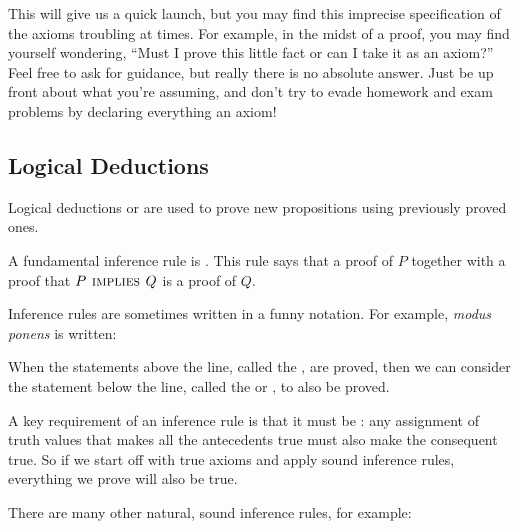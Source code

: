 This will give us a quick launch, but you may find this imprecise
specification of the axioms troubling at times.  For example, in the midst
of a proof, you may find yourself wondering, ``Must I prove this little
fact or can I take it as an axiom?''  Feel free to ask for guidance, but
really there is no absolute answer.  Just be up front about what you're
assuming, and don't try to evade homework and exam problems by declaring
everything an axiom!

\subsection{Logical Deductions }

Logical deductions or  are used to prove new
propositions using previously proved ones.

A fundamental inference rule is .  This rule says that
a proof of $P$ together with a proof that $P \mathbin{\mathrm{\textsc{\,implies\,}}} Q$ is a proof of
$Q$.

Inference rules are sometimes written in a funny notation.  For example,
\emph{modus ponens} is written:
\begin{rul*}
\end{rul*}

When the statements above the line, called the , are
proved, then we can consider the statement below the line, called the
 or , to also be proved.

A key requirement of an inference rule is that it must be : any
assignment of truth values that makes all the antecedents true must also
make the consequent true.  So if we start off with true axioms and apply
sound inference rules, everything we prove will also be true.

There are many other natural, sound inference rules, for example:
\begin{rul*}
\end{rul*}

\begin{editingnotes}

\begin{rul*}
\end{rul*}

\end{editingnotes}

\begin{rul*}
\end{rul*}

